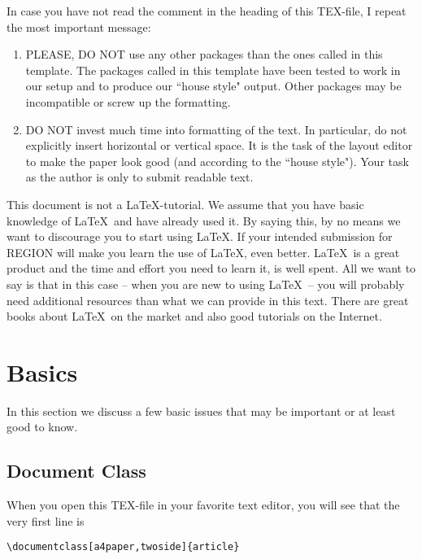 \documentclass[a4paper,twoside]{article}
\begin{document}
In case you have not read the comment in the heading of this TEX-file, I repeat the most important message:
\begin{enumerate}
\item PLEASE, DO NOT use any other packages than the ones called in this template. The packages called in this template have been tested to work in our setup and to produce our ``house style" output. Other packages may be incompatible or screw up the formatting. 
\item DO NOT invest much time into formatting of the text. In particular, do not explicitly insert horizontal or vertical space. It is the task of the layout editor to make the paper look good (and according to the ``house style"). Your task as the author is only to submit readable text.
\end{enumerate}
This document is not a \LaTeX-tutorial. We assume that you have basic knowledge of \LaTeX\ and have already used it. By saying this, by no means we want to discourage you to start using \LaTeX. If your intended submission for REGION will make you learn the use of \LaTeX, even better. \LaTeX\ is a great product and the time and effort you need to learn it, is well spent. All we want to say is that in this case -- when you are new to using \LaTeX\ -- you will probably need additional resources than what we can provide in this text. There are great books about \LaTeX\ on the market and also good tutorials on the Internet. 

\section{Basics}
\label{sec:2}

In this section we discuss a few basic issues that may be important or at least good to know.

\subsection{Document Class}
\label{sec:2.1}

When you open this TEX-file in your favorite text editor, you will see that the very first line is

\begin{verbatim}
\documentclass[a4paper,twoside]{article}
\end{verbatim}
\end{document}
